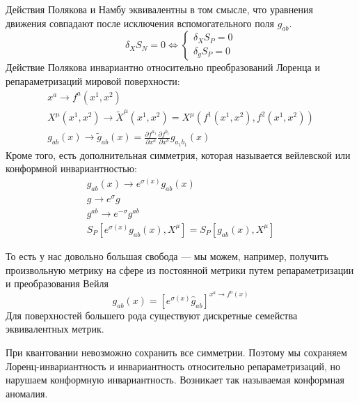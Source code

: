 \documentclass[a4paper,12pt]{article}
\theoremstyle{definition} \newtheorem{Def}{Definition}
\begin{document}
Действия Полякова и Намбу эквивалентны в том смысле, что уравнения движения совпадают после исключения вспомогательного поля $g_{ab}$.
\begin{equation}
  \label{eq:6}
  \delta_{X}S_N=0 \Longleftrightarrow \left\{
      \begin{aligned}
        \delta_X S_P=0\\
        \delta_g S_P=0
      \end{aligned}
      \right.
\end{equation}
Действие Полякова инвариантно относительно преобразований Лоренца и репараметризаций мировой поверхности:
\begin{equation}
  \label{eq:7}
  \begin{split}
    x^a \to f^a (x^1,x^2)\\
    X^{\mu}(x^1,x^2)\to \tilde{X}^{\mu}(x^1,x^2)=X^{\mu}(f^1(x^1,x^2),f^2(x^1,x^2))\\
    g_{ab}(x)\to \tilde{g}_{ab}(x)=\frac{\partial f^{a_1}}{\partial x^{a}}\frac{\partial f^{b_1}}{\partial x^b} g_{a_1 b_1}(x)
  \end{split}
\end{equation}
Кроме того, есть дополнительная симметрия, которая называется вейлевской или конформной инвариантностью:
\begin{equation}
  \label{eq:8}
  \begin{split}
    g_{ab}(x)\to e^{\sigma(x)}g_{ab}(x)\\
    g\to e^{\sigma} g\\
    g^{ab}\to e^{-\sigma} g^{ab}\\
    S_P[e^{\sigma(x)} g_{ab}(x),X^{\mu}] = S_P[g_{ab}(x),X^{\mu}]
  \end{split}
\end{equation}

То есть у нас довольно большая свобода --- мы можем, например, получить произвольную метрику на сфере из постоянной метрики путем репараметризации и преобразования Вейля
\begin{equation}
  \label{eq:9}
  g_{ab}(x)=[e^{\sigma(x)}\hat{g}_{ab}]^{x^a\to f^a (x)}
\end{equation}
Для поверхностей большего рода существуют дискретные семейства эквивалентных метрик.

При квантовании невозможно сохранить все симметрии. Поэтому мы сохраняем Лоренц-инвариантность и инвариантность относительно репараметризаций, но нарушаем конформную инвариантность. Возникает так называемая конформная аномалия.
\end{document}

